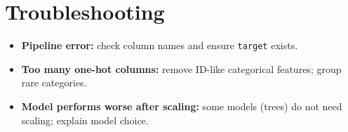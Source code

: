 \documentclass[11pt]{article}
\begin{document}
\section{Troubleshooting}
\begin{itemize}[leftmargin=*]
  \item \textbf{Pipeline error:} check column names and ensure \texttt{target} exists.
  \item \textbf{Too many one-hot columns:} remove ID-like categorical features; group rare categories.
  \item \textbf{Model performs worse after scaling:} some models (trees) do not need scaling; explain model choice.
\end{itemize}

\notesources{\AIMLLabSources}
\end{document}
